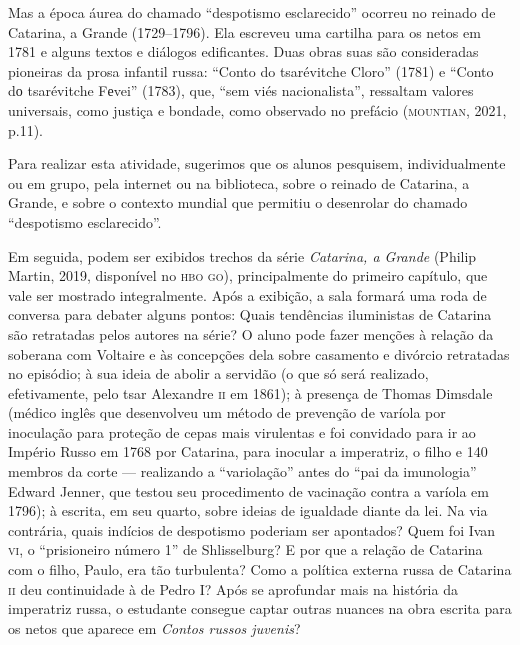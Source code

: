 \documentclass[11pt]{extarticle}
\begin{document}
Mas a época áurea do chamado ``despotismo esclarecido'' ocorreu no reinado
de Catarina, a Grande (1729--1796). Ela escreveu uma cartilha para os netos em
1781 e alguns textos e diálogos edificantes. Duas obras suas são
consideradas pioneiras da prosa infantil russa: ``Conto do tsarévitche
Cloro'' (1781) e ``Conto dо tsarévitche Fеvei'' (1783),
que, ``sem viés nacionalista'', ressaltam valores universais, como
justiça e bondade, como observado no prefácio (\textsc{mountian}, 2021, p.11).

Para realizar esta atividade, sugerimos que os alunos pesquisem,
individualmente ou em grupo, pela internet ou na biblioteca, sobre o
reinado de Catarina, a Grande, e sobre o contexto mundial que permitiu o
desenrolar do chamado ``despotismo esclarecido''.


Em seguida, podem ser exibidos trechos da série \emph{Catarina, a
Grande} (Philip Martin, 2019, disponível no \textsc{hbo go}), principalmente do
primeiro capítulo, que vale ser mostrado integralmente. Após a exibição,
a sala formará uma roda de conversa para debater alguns pontos: Quais
tendências iluministas de Catarina são retratadas pelos autores na
série? O aluno pode fazer menções à relação da soberana com Voltaire e
às concepções dela sobre casamento e divórcio retratadas no episódio; à
sua ideia de abolir a servidão (o que só será realizado, efetivamente,
pelo tsar Alexandre \textsc{ii} em 1861); à presença de Thomas Dimsdale (médico
inglês que desenvolveu um método de prevenção de varíola por inoculação
para proteção de cepas mais virulentas e foi convidado para ir ao
Império Russo em 1768 por Catarina, para inocular a imperatriz, o filho
e 140 membros da corte --- realizando a ``variolação'' antes do ``pai da
imunologia'' Edward Jenner, que testou seu procedimento de vacinação
contra a varíola em 1796); à escrita, em seu quarto, sobre ideias de
igualdade diante da lei. Na via contrária, quais indícios de despotismo
poderiam ser apontados? Quem foi Ivan \textsc{vi}, o ``prisioneiro número 1'' de
Shlisselburg? E por que a relação de Catarina com o filho, Paulo, era
tão turbulenta? Como a política externa russa de Catarina \textsc{ii} deu
continuidade à de Pedro I? Após se aprofundar mais na história da
imperatriz russa, o estudante consegue captar outras nuances na obra
escrita para os netos que aparece em \emph{Contos russos juvenis}?
\end{document}

